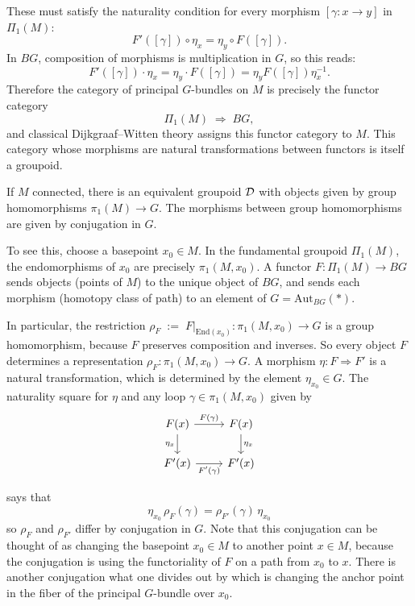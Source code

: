 \documentclass[12pt]{article}
\begin{document}
These must satisfy the naturality condition for every morphism $[\gamma:x\to y]$ in $\Pi_1(M)$:
\[F'([\gamma]) \circ \eta_x = \eta_y \circ F([\gamma]).\]
In $BG$, composition of morphisms is multiplication in $G$, so this reads:
\[F'([\gamma]) \cdot \eta_x = \eta_y \cdot F([\gamma]) = \eta_y F([\gamma]) \eta_x^{-1}.\]
Therefore the category of principal $G$-bundles on $M$ is precisely the functor category
\[
    \Pi_1(M) \;\Rightarrow\; BG,
\]
and classical Dijkgraaf--Witten theory assigns this functor category to $M$. This category whose morphisms are natural transformations between functors is itself a groupoid. 

\begin{example}[Connected $M$]
    If $M$ connected, there is an equivalent groupoid ${\mathcal{D}}$ with objects given by group homomorphisms $\pi_1(M) \to G$. The morphisms between group homomorphisms are given by conjugation in $G$.

To see this, choose a basepoint $x_0\in M$. In the fundamental groupoid $\Pi_1(M)$, the endomorphisms of $x_0$ are precisely $\pi_1(M,x_0)$. A functor $F\colon\Pi_1(M)\to BG$ sends objects (points of $M$) to the unique object of $BG$, and sends each morphism (homotopy class of path) to an element of $G=\mathrm{Aut}_{BG}(*)$. 

In particular, the restriction $\rho_F \;:=\; F\big|_{\mathrm{End}(x_0)}\colon \pi_1(M,x_0)\longrightarrow G$
    is a group homomorphism, because $F$ preserves composition and inverses. So every object $F$ determines a representation $\rho_F\colon\pi_1(M,x_0)\to G$. A morphism $\eta\colon F\Rightarrow F'$ is a natural transformation, which is determined by the element $\eta_{x_0}\in G$. The naturality square for $\eta$ and any loop $\gamma\in \pi_1(M,x_0)$ given by \[
        \begin{tikzcd}
            F(x) \arrow[r,"F(\gamma)"] \arrow[d,"\eta_x"'] & F(x) \arrow[d,"\eta_x"] \\
            F'(x) \arrow[r,"F'(\gamma)"'] & F'(x)
        \end{tikzcd}
    \]

    says that
    \[\eta_{x_0} \, \rho_F(\gamma) = \rho_{F'}(\gamma)\, \eta_{x_0}\] so $\rho_F$ and $\rho_{F'}$ differ by conjugation in $G$. Note that this conjugation can be thought of as changing the basepoint $x_0 \in M$ to another point $x\in M$, because the conjugation is using the functoriality of $F$ on a path from $x_0$ to $x$. There is another conjugation what one divides out by which is changing the anchor point in the fiber of the principal $G$-bundle over $x_0$.


\end{example}
\end{document}
